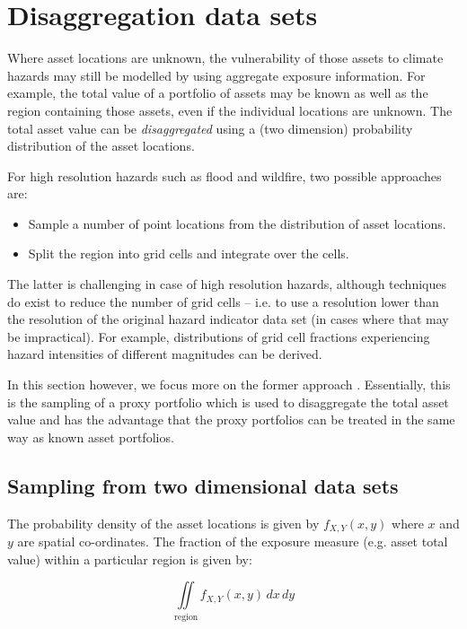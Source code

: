 \documentclass[a4paper,11pt]{extarticle} %
\theoremstyle{definition}
\begin{document}
\section{Disaggregation data sets}

Where asset locations are unknown, the vulnerability of those assets to climate hazards may still be modelled by using aggregate exposure information. For example, the total value of a portfolio of assets may be known as well as the region containing those assets, even if the individual locations are unknown. The total asset value can be \emph{disaggregated} using  a (two dimension) probability distribution of the asset locations.

For high resolution hazards such as flood and wildfire, two possible approaches are:
\begin{itemize}
\item Sample a number of point locations from the distribution of asset locations.
\item Split the region into grid cells and integrate over the cells.
\end{itemize}

The latter is challenging in case of high resolution hazards, although techniques do exist to reduce the number of grid cells -- i.e. to use a resolution lower than the resolution of the original hazard indicator data set (in cases where that may be impractical). For example, distributions of grid cell fractions experiencing hazard intensities of different magnitudes can be derived.

In this section however, we focus more on the former approach . Essentially, this is the sampling of a proxy portfolio which is used to disaggregate the total asset value and has the advantage that the proxy portfolios can be treated in the same way as known asset portfolios.


\subsection{Sampling from two dimensional data sets}
The probability density of the asset locations is given by $f_{X, Y}(x, y)$ where $x$ and $y$ are spatial co-ordinates. The fraction of the exposure measure (e.g. asset total value) within a particular region is given by:

\begin{equation}
    \label{Eq:Disagg1}
    \iint\limits_{\mathrm{region}} f_{X, Y}(x, y) \, dx \, dy
\end{equation}
\end{document}
